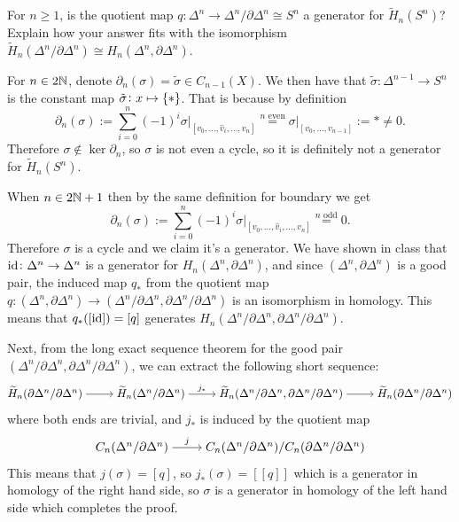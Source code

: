 \documentclass[11pt,a4paper]{article}
\newcommand{\face}[1]{[v_0,\dots,\hat{v}_{#1},\dots,v_n]}
\begin{document}
\begin{exercise}
  For $n \geq 1$,
  is the quotient map $q \colon \Delta^n \to \Delta^n / \partial \Delta^n
  \cong S^n$ a generator for $\widetilde H_n(S^n)$?
  Explain how your answer fits with the isomorphism
  $\widetilde H_n(\Delta^n / \partial \Delta^n) \cong
    H_n(\Delta^n,\partial \Delta^n)$.
\end{exercise}
\begin{solution}
  For $n \in 2\mathbb{N}$, denote $\partial_n(\sigma) = \tilde \sigma \in C_{n-1}(X)$.
  We then have that $\tilde \sigma \colon \Delta^{n-1} \to S^n$ is the
  constant map $\tilde \sigma \colon x \mapsto \left\{*\right\}$.
  That is because by definition
  \[
    \partial_n(\sigma) :=
    \sum_{i=0}^{n} (-1)^{i} \sigma\vert_{\face{i}} \overset{n\text{ even}}{=}
    \sigma\vert_{[v_0,\dots,v_{n-1}]} := * \neq 0.
  \]
  Therefore $\sigma \notin \ker \partial_n$,
  so $\sigma$ is not even a cycle, so it is definitely not a generator
  for $\widetilde H_n(S^n)$.

  When $n \in 2\mathbb{N} + 1$ then by the same definition for boundary we get
  \[
    \partial_n(\sigma) :=
    \sum_{i=0}^{n} (-1)^{i} \sigma\vert_{\face{i}} \overset{n\text{ odd}}{=}
    0.
  \]
  Therefore $\sigma$ is a cycle and we claim it's a generator.
  We have shown in class that $\operatorname{id} \colon \Delta^n \to \Delta^n$ is a generator
  for $H_n(\Delta^n,\partial \Delta^n)$,
  and since $(\Delta^n,\partial \Delta^n)$ is a good pair,
  the induced map $q_*$ from the quotient map
  $q \colon (\Delta^n,\partial \Delta^n) \to (\Delta^n/\partial \Delta^n,\partial \Delta^n/\partial \Delta^n)$
  is an isomorphism in homology.
  This means that $q_*([\operatorname{id}]) = [q]$
  generates $H_n(\Delta^n/\partial \Delta^n,\partial \Delta^n/\partial \Delta^n)$.

  Next, from the long exact sequence theorem for the good pair
  $(\Delta^n/\partial \Delta^n,\partial \Delta^n/\partial \Delta^n)$,
  we can extract the following short sequence:
  \[\begin{tikzcd}[ampersand replacement=\&,cramped]
    {\widetilde H_n(\partial\Delta^n/\partial\Delta^n)} \& {\widetilde H_n(\Delta^n/\partial\Delta^n)} \& {\widetilde H_n(\Delta^n/\partial\Delta^n,\partial\Delta^n/\partial\Delta^n)} \& {\widetilde H_n(\partial\Delta^n/\partial\Delta^n)}
    \arrow[from=1-1, to=1-2]
    \arrow["{j_*}", from=1-2, to=1-3]
    \arrow[from=1-3, to=1-4]
  \end{tikzcd}\]
  where both ends are trivial, and $j_*$ is induced by the quotient map
  \[\begin{tikzcd}[ampersand replacement=\&,cramped]
    {C_n(\Delta^n/\partial\Delta^n)} \& {C_n(\Delta^n/\partial\Delta^n)/C_n(\partial\Delta^n/\partial\Delta^n)}
    \arrow["j", from=1-1, to=1-2]
  \end{tikzcd}\]
  This means that $j(\sigma) = [q]$, so $j_*(\sigma) = [[q]]$
  which is a generator in homology of the right hand side,
  so $\sigma$ is a generator in homology
  of the left hand side which completes the proof.
\end{solution}
\end{document}
